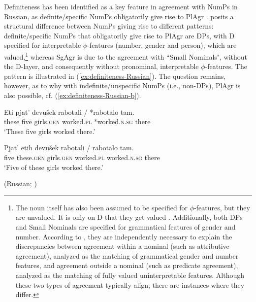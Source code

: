\documentclass[output=paper,colorlinks,citecolor=brown
]{langscibook}
\begin{document}
Definiteness has been identified as a key feature in agreement with NumPs in Russian, as definite/specific NumPs obligatorily give rise to PlAgr \citep{Pereltsvaig2006, Matushansky2014, Matushansky2015a, Matushansky2015}. \citet{Pereltsvaig2006} posits a structural difference between NumPs giving rise to different patterns: definite/specific NumPs that obligatorily give rise to PlAgr are DPs, with D specified for interpretable $\phi$-features (number, gender and person), which are valued,\footnote{The noun itself has also been assumed to be specified for $\phi$-features, but they are unvalued. It is only on D that they get valued \citep[484]{Pereltsvaig2006}. Additionally, both DPs and Small Nominals are specified for grammatical features of gender and number. According to \citeauthor{Pereltsvaig2006}, they are independently necessary to explain the discrepancies between agreement within a nominal (such as attributive agreement), analyzed as the matching of grammatical gender and number features, and agreement outside a nominal (such as predicate agreement), analyzed as the matching of fully valued uninterpretable features. Although these two types of agreement typically align, there are instances where they differ.} whereas SgAgr is due to the agreement with “Small Nominals", without the D-layer, and consequently without pronominal, interpretable $\phi$-features. The pattern is illustrated in (\ref{ex:definiteness-Russian}). The question remains, however, as to why with indefinite/unspecific NumPs (i.e., non-DPs), PlAgr is also possible, cf. (\ref{ex:definiteness-Russian-b}).

\ea \label{ex:definiteness-Russian}
\begin{xlist}
\ex 
\gll Eti pjat' devušek rabotali / *rabotalo tam.\\
     these five girls.\textsc{gen} worked.\textsc{pl} {} *worked.\textsc{n.sg} there\\
\glt `These five girls worked there.'

\ex \label{ex:definiteness-Russian-b}
\gll Pjat' etih devušek rabotali / rabotalo tam.\\
     five these.\textsc{gen} girls.\textsc{gen} worked.\textsc{pl} {} worked.\textsc{n.sg} there\\
\glt `Five of these girls worked there.'
\end{xlist} \z \hfill{(Russian; \citealt[]{Pereltsvaig2006})}
\end{document}
